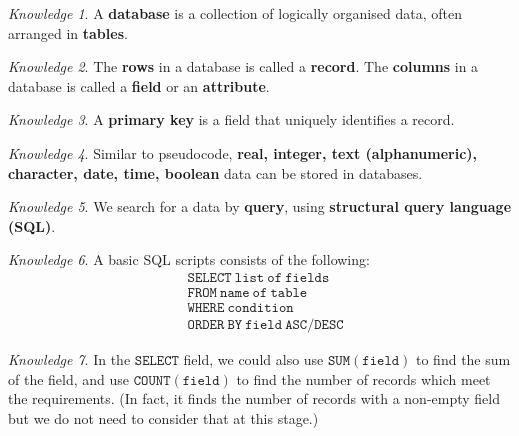 \documentclass[8pt]{article}
\theoremstyle{remark}
\newtheorem{knowledge}{Knowledge}[subsection]
\begin{document}
        \begin{knowledge}
            A \textbf{database} is a collection of logically organised data, often arranged in \textbf{tables}.
        \end{knowledge}

        \begin{knowledge}
            The \textbf{rows} in a database is called a \textbf{record}. The \textbf{columns} in a database is called a \textbf{field} or an \textbf{attribute}.
        \end{knowledge}

        \begin{knowledge}
            A \textbf{primary key} is a field that uniquely identifies a record.
        \end{knowledge}

        \begin{knowledge}
            Similar to pseudocode, \textbf{real, integer, text (alphanumeric), character, date, time, boolean} data can be stored in databases.
        \end{knowledge}

        \begin{knowledge}
            We search for a data by \textbf{query}, using \textbf{structural query language (SQL)}.
        \end{knowledge}

        \begin{knowledge}
            A basic SQL scripts consists of the following:
            \begin{align*}
                &\mathtt{SELECT\ list\ of\ fields}\\
                &\mathtt{FROM\ name\ of\ table}\\
                &\mathtt{WHERE\ condition}\\
                &\mathtt{ORDER\ BY\ field\ ASC/DESC}
            \end{align*}
        \end{knowledge}

        \begin{knowledge}
            In the \(\mathtt{SELECT}\) field, we could also use \(\mathtt{SUM(field)}\) to find the sum of the field, and use \(\mathtt{COUNT(field)}\) to find the number of records which meet the requirements. (In fact, it finds the number of records with a non-empty field but we do not need to consider that at this stage.)
        \end{knowledge}
\end{document}
